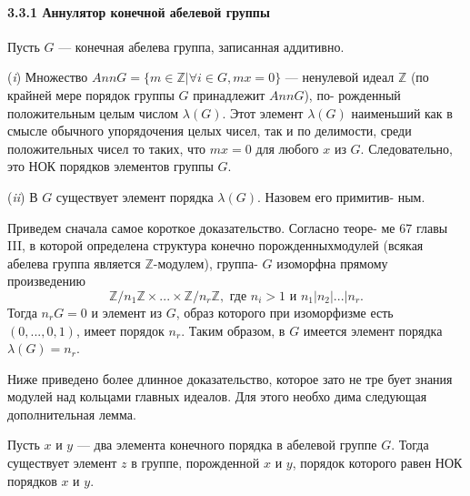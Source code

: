 \documentclass{../template/mai_book}
\begin{document}
\paragraph{3.3.1 Аннулятор конечной абелевой группы}
\begin{predl}
Пусть $G$ — конечная абелева группа, записанная аддитивно.
 
\par  (\textit{i}) Множество $AnnG = \{m \in \mathbb{Z} | \forall i \in G, mx = 0\}$ — ненулевой\linebreak
идеал $\mathbb{Z}$ (по крайней мере порядок группы $G$ принадлежит $Ann G$), по­-\linebreak
рожденный положительным целым числом $\lambda(G)$. Этот элемент $\lambda(G)$\linebreak
наименьший как в смысле обычного упорядочения целых чисел, так\linebreak
и по делимости, среди положительных чисел то таких, что $mx = 0$ для\linebreak
любого $x$ из $G$. Следовательно, это НОК порядков элементов группы $G$.
\par  (\textit{ii}) В $G$ существует элемент порядка $\lambda(G)$. Назовем его примитив­-\linebreak
ным.
 
\end{predl}
\begin{myproof}
Приведем сначала самое короткое доказательство. Согласно теоре­-\linebreak
ме 67 главы III, в которой определена структура конечно порожденных\linebreak модулей (всякая абелева группа является $\mathbb{Z}$-модулем), группа-\linebreak
$G$ изоморфна прямому произведению\\
$$\mathbb{Z}/n_1\mathbb{Z}\times...\times\mathbb{Z}/n_r\mathbb{Z}, \text { где } n_i > 1 \text{ и } n_1 | n_2 | ... | n_r.$$
Тогда $n_rG = 0$ и элемент из $G$, образ которого при изоморфизме\linebreak
есть $(0,...,0,1)$, имеет порядок $n_r$. Таким образом, в $G$ имеется\linebreak
элемент порядка $\lambda(G) = n_r$.
\end{myproof}
\newpage
Ниже приведено более длинное доказательство, которое зато не тре­
бует знания модулей над кольцами главных идеалов. Для этого необхо­
дима следующая дополнительная лемма.
\begin{lemma}
Пусть $x$ и $y$ — два элемента конечного порядка в абелевой группе\linebreak
$G$. Тогда существует элемент $z$ в группе, порожденной $x$ и $y$, порядок\linebreak
которого равен НОК порядков $x$ и $y$.
\end{lemma}
\end{document}

